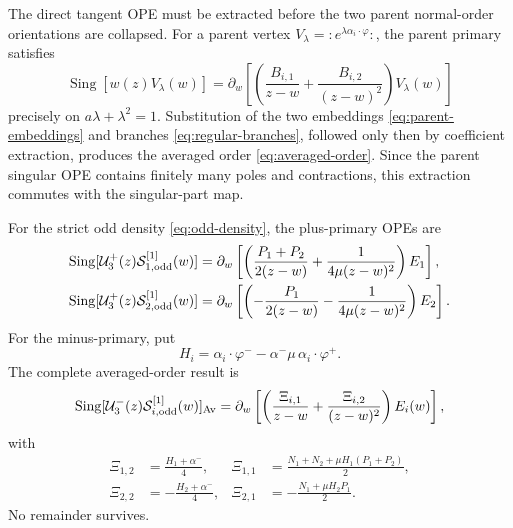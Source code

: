 \documentclass[11pt,a4paper]{article}
\numberwithin{equation}{section}
\theoremstyle{remark}
\newcommand{\Sing}{\operatorname{Sing}}
\newcommand{\cU}{\mathcal U}
\newcommand{\cS}{\mathcal S}
\begin{document}
The direct tangent OPE must be extracted before the two parent normal-order orientations are
collapsed.  For a parent vertex $V_\lambda=:e^{\lambda\alpha_i\cdot\varphi}:$, the parent
primary satisfies
\begin{equation}
 \Sing[w(z)V_\lambda(w)]
 =\partial_w\left[\left(\frac{B_{i,1}}{z-w}
 +\frac{B_{i,2}}{(z-w)^2}\right)V_\lambda(w)\right]
 \label{eq:parent-total-derivative}
\end{equation}
precisely on $a\lambda+\lambda^2=1$.  Substitution of the two embeddings
\cref{eq:parent-embeddings} and branches \cref{eq:regular-branches}, followed only then by
coefficient extraction, produces the averaged order \cref{eq:averaged-order}.  Since the parent
singular OPE contains finitely many poles and contractions, this extraction commutes with the
singular-part map.

For the strict odd density \cref{eq:odd-density}, the plus-primary OPEs are
\begin{align}
 \Sing[\cU_3^+(z)\cS_{1,\rm odd}^{[1]}(w)]
 &=\partial_w\left[\left(\frac{P_1+P_2}{2(z-w)}
 +\frac{1}{4\mu(z-w)^2}\right)E_1\right],
 \label{eq:tangent-plus-root1}\\
 \Sing[\cU_3^+(z)\cS_{2,\rm odd}^{[1]}(w)]
 &=\partial_w\left[\left(-\frac{P_1}{2(z-w)}
 -\frac{1}{4\mu(z-w)^2}\right)E_2\right].
 \label{eq:tangent-plus-root2}
\end{align}
For the minus-primary, put
\begin{equation}
 H_i=\alpha_i\cdot\varphi^--\alpha^-\mu\,\alpha_i\cdot\varphi^+.
 \label{eq:Hi}
\end{equation}
The complete averaged-order result is
\begin{equation}
 \Sing[\cU_3^-(z)\cS_{i,\rm odd}^{[1]}(w)]_{\rm Av}
 =\partial_w\left[\left(\frac{\Xi_{i,1}}{z-w}
 +\frac{\Xi_{i,2}}{(z-w)^2}\right)E_i(w)\right],
 \label{eq:odd-exact-ope}
\end{equation}
with
\begin{align}
 \Xi_{1,2}&=\frac{H_1+\alpha^-}{4},
 &\Xi_{1,1}&=\frac{N_1+N_2+\mu H_1(P_1+P_2)}2,
 \label{eq:xi-root1}\\
 \Xi_{2,2}&=-\frac{H_2+\alpha^-}{4},
 &\Xi_{2,1}&=-\frac{N_1+\mu H_2P_1}{2}.
 \label{eq:xi-root2}
\end{align}
No remainder survives.
\end{document}
